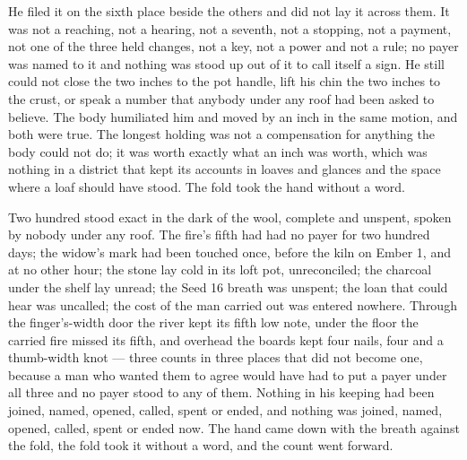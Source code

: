 He filed it on the sixth place beside the others and did not lay it across them. It was not a reaching, not a hearing, not a seventh, not a stopping, not a payment, not one of the three held changes, not a key, not a power and not a rule; no payer was named to it and nothing was stood up out of it to call itself a sign. He still could not close the two inches to the pot handle, lift his chin the two inches to the crust, or speak a number that anybody under any roof had been asked to believe. The body humiliated him and moved by an inch in the same motion, and both were true. The longest holding was not a compensation for anything the body could not do; it was worth exactly what an inch was worth, which was nothing in a district that kept its accounts in loaves and glances and the space where a loaf should have stood. The fold took the hand without a word.

Two hundred stood exact in the dark of the wool, complete and unspent, spoken by nobody under any roof. The fire's fifth had had no payer for two hundred days; the widow's mark had been touched once, before the kiln on Ember 1, and at no other hour; the stone lay cold in its loft pot, unreconciled; the charcoal under the shelf lay unread; the Seed 16 breath was unspent; the loan that could hear was uncalled; the cost of the man carried out was entered nowhere. Through the finger's-width door the river kept its fifth low note, under the floor the carried fire missed its fifth, and overhead the boards kept four nails, four and a thumb-width knot --- three counts in three places that did not become one, because a man who wanted them to agree would have had to put a payer under all three and no payer stood to any of them. Nothing in his keeping had been joined, named, opened, called, spent or ended, and nothing was joined, named, opened, called, spent or ended now. The hand came down with the breath against the fold, the fold took it without a word, and the count went forward.
